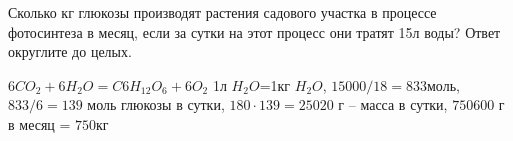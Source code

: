 
Сколько кг глюкозы производят растения садового участка в процессе фотосинтеза в месяц, если за сутки на этот процесс они тратят 15л воды? Ответ округлите до целых.

\soultionSection

$6CO_2+6H_2O=C6H_{12}O_6+6O_2$ 1л $H_2O$=1кг $H_2O$, 
$15000/18=833$моль, \linebreak $833/6=139$ моль глюкозы в сутки, $180 \cdot 139 = 25020$ г – масса в сутки, 
$750600$ г в месяц = $750$кг

